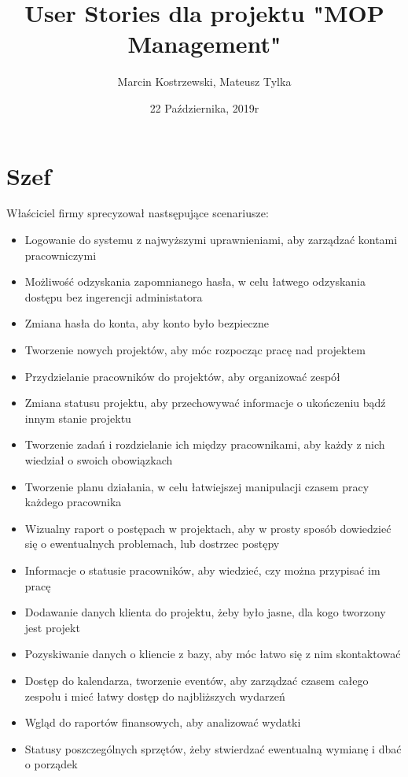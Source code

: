 \documentclass{article}
\title{User Stories dla projektu "MOP Management"}
\author{Marcin Kostrzewski, Mateusz Tylka}
\date{22 Października, 2019r}
\begin{document}
\maketitle
\newpage
\tableofcontents
\newpage

\section{Szef}
Właściciel firmy sprecyzował nastsępujące scenariusze:
\begin{itemize}
    \item Logowanie do systemu z najwyższymi uprawnieniami, aby zarządzać kontami pracowniczymi
    \item Możliwość odzyskania zapomnianego hasła, w celu łatwego odzyskania dostępu bez ingerencji administatora
    \item Zmiana hasła do konta, aby konto było bezpieczne
    \item Tworzenie nowych projektów, aby móc rozpocząc pracę nad projektem
    \item Przydzielanie pracowników do projektów, aby organizować zespół
    \item Zmiana statusu projektu, aby przechowywać informacje o ukończeniu bądź innym stanie projektu
    \item Tworzenie zadań i rozdzielanie ich między pracownikami, aby każdy z nich wiedział o swoich obowiązkach
    \item Tworzenie planu działania, w celu łatwiejszej manipulacji czasem pracy każdego pracownika
    \item Wizualny raport o postępach w projektach, aby w prosty sposób dowiedzieć się o ewentualnych problemach, lub dostrzec postępy
    \item Informacje o statusie pracowników, aby wiedzieć, czy można przypisać im pracę
    \item Dodawanie danych klienta do projektu, żeby było jasne, dla kogo tworzony jest projekt
    \item Pozyskiwanie danych o kliencie z bazy, aby móc łatwo się z nim skontaktować
    \item Dostęp do kalendarza, tworzenie eventów, aby zarządzać czasem całego zespołu i mieć łatwy dostęp do najbliższych wydarzeń
    \item Wgląd do raportów finansowych, aby analizować wydatki
    \item Statusy poszczególnych sprzętów, żeby stwierdzać ewentualną wymianę i dbać o porządek
\end{itemize}
\end{document}
